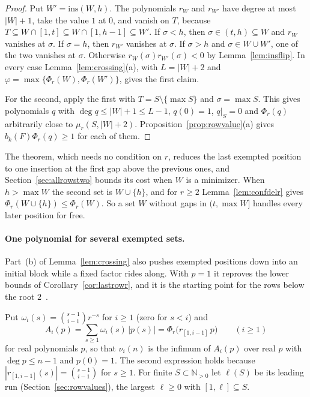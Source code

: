\documentclass[11pt]{article}
\newcommand{\N}{\mathbb N}
\begin{document}
\begin{proof}
Put $W'=\mathrm{ins}(W,h)$.  The polynomials $r_W$ and $r_{W'}$ have degree
at most $|W|+1$, take the value $1$ at $0$, and vanish on $T$, because
$T\subseteq W\cap[1,t]\subseteq W\cap[1,h-1]\subseteq W'$.  If $\sigma<h$,
then $\sigma\in(t,h)\subseteq W$ and $r_W$ vanishes at $\sigma$.  If
$\sigma=h$, then $r_{W'}$ vanishes at $\sigma$.  If $\sigma>h$ and
$\sigma\in W\cup W'$, one of the two vanishes at $\sigma$.  Otherwise
$r_W(\sigma)r_{W'}(\sigma)<0$ by Lemma~\ref{lem:insflip}.  In every case
Lemma~\ref{lem:crossing}(a), with $L=|W|+2$ and
$\varphi=\max\{\Phi_r(W),\Phi_r(W')\}$, gives the first claim.

For the second, apply the first with $T=S\setminus\{\max S\}$ and
$\sigma=\max S$.  This gives polynomials $q$ with $\deg q\le|W|+1\le L-1$,
$q(0)=1$, $q|_S=0$ and $\Phi_r(q)$ arbitrarily close to
$\mu_r(S,|W|+2)$.  Proposition~\ref{prop:rowvalue}(a) gives
$b_k(F)\Phi_r(q)\ge1$ for each of them.
\end{proof}

The theorem, which needs no condition on $r$, reduces the last exempted
position to one insertion at the first gap above the previous ones, and
Section~\ref{sec:allrowstwo} bounds its cost when $W$ is a minimizer.
When $h>\max W$ the second set is $W\cup\{h\}$, and for $r\ge2$
Lemma~\ref{lem:confdelr} gives $\Phi_r(W\cup\{h\})\le\Phi_r(W)$.  So a set
$W$ without gaps in $(t,\max W]$ handles every later position for free.

\paragraph{One polynomial for several exempted sets.}
Part~(b) of Lemma~\ref{lem:crossing} also pushes exempted positions down
into an initial block while a fixed factor rides along.  With $p=1$ it
reproves the lower bounds of Corollary~\ref{cor:lastrowr}, and it is the starting point
for the rows below the root $2$~\cite{coefficient-mass-belowtwo}.

Put $\omega_i(s)=\binom{s-1}{i-1}r^{-s}$ for $i\ge1$ (zero for $s<i$) and
\[
  A_i(p)=\sum_{s\ge1}\omega_i(s)\,|p(s)|=\Phi_r\bigl(r_{[1,i-1]}\,p\bigr)
  \qquad(i\ge1)
\]
for real polynomials $p$, so that $\nu_i(n)$ is the infimum of $A_i(p)$ over
real $p$ with $\deg p\le n-1$ and $p(0)=1$.  The second expression holds because $|r_{[1,i-1]}(s)|=\binom{s-1}{i-1}$
for $s\ge1$.  For finite $S\subset\N_{>0}$ let $\ell(S)$ be its leading
run (Section~\ref{sec:rowvalues}), the largest $\ell\ge0$ with
$[1,\ell]\subseteq S$.
\end{document}
